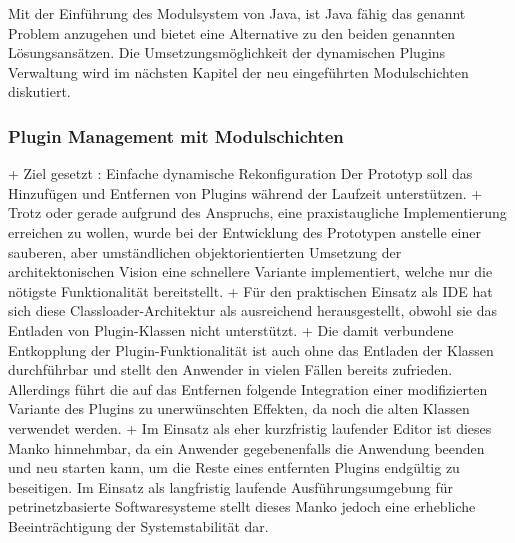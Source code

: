 			Mit der Einführung des Modulsystem von Java, ist Java fähig das genannt Problem anzugehen und bietet eine Alternative zu den beiden genannten Lösungsansätzen. Die Umsetzungsmöglichkeit der dynamischen Plugins Verwaltung wird im nächsten Kapitel der neu eingeführten Modulschichten diskutiert. 

			\subsubsection{Plugin Management mit Modulschichten}\label{ssub:plugin_managment_mit_modulschichten}
			


			+ Ziel gesetzt : Einfache dynamische Rekonfiguration Der Prototyp soll das Hinzufügen und Entfernen von Plugins während der Laufzeit unterstützen.
			+ Trotz oder gerade aufgrund des Anspruchs, eine praxistaugliche Implementierung erreichen zu wollen, wurde bei der Entwicklung des Prototypen anstelle einer sauberen, aber umständlichen objektorientierten Umsetzung der architektonischen Vision eine schnellere Variante implementiert, welche nur die nötigste Funktionalität bereitstellt. %
			+ Für den praktischen Einsatz als IDE hat sich diese Classloader-Architektur als ausreichend herausgestellt, obwohl sie das Entladen von Plugin-Klassen nicht unterstützt. %
			+ Die damit verbundene Entkopplung der Plugin-Funktionalität ist auch ohne das Entladen der Klassen durchführbar und stellt den Anwender in vielen Fällen bereits zufrieden. Allerdings führt die auf das Entfernen folgende Integration einer modifizierten Variante des Plugins zu unerwünschten Effekten, da noch die alten Klassen verwendet werden. %
			 +  Im Einsatz als eher kurzfristig laufender Editor ist dieses Manko hinnehmbar, da ein Anwender gegebenenfalls die Anwendung beenden und neu starten kann, um die Reste eines entfernten Plugins endgültig zu beseitigen. Im Einsatz als langfristig laufende Ausführungsumgebung für petrinetzbasierte Softwaresysteme stellt dieses Manko jedoch eine erhebliche Beeinträchtigung der Systemstabilität dar. %


